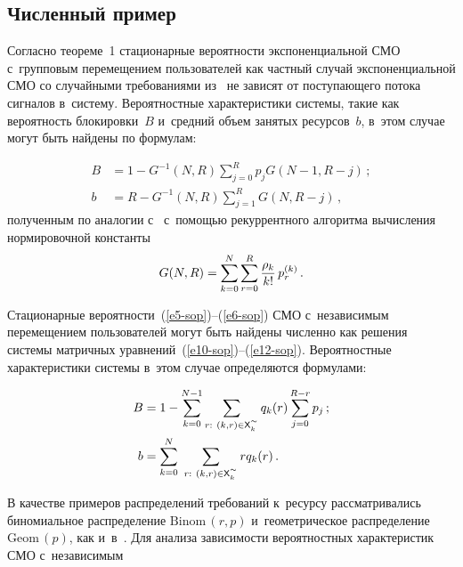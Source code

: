 \begin{multicols}{2}
\section{Численный пример}

  Согласно теореме~1 стационарные вероятности экспоненциальной СМО 
с~групповым перемещением пользователей как частный случай 
экспоненциальной СМО со случайными требованиями из~\cite{8-sop} не 
зависят от поступающего потока сигналов в~систему. Вероятностные 
характеристики системы, такие как вероятность блокировки~$B$ и~средний 
объем занятых ресурсов~$b$, в~этом случае могут быть найдены по 
формулам:

\noindent
  \begin{align*}
  B &= 1-G^{-1}(N,R)\sum\limits_{j=0}^R p_j G(N-1,R-j)\,;
  \\
  b &= R-G^{-1}(N,R) \sum\limits_{j=1}^R G(N,R-j)\,, %
  \end{align*}
полученным по аналогии с~\cite{11-sop} с~по\-мощью рекуррентного 
алгоритма вычисления нормировочной константы 
$$
G(N,R)= 
\sum\limits_{k=0}^N \sum\limits_{r=0}^R \displaystyle\frac{\displaystyle \rho_k\mathstrut}{\displaystyle k!\mathstrut}\,p_r^{(k)}\,. 
$$

  Стационарные вероятности~(\ref{e5-sop})--(\ref{e6-sop}) СМО 
с~независимым перемещением пользователей могут быть найдены численно 
как решения системы матричных уравнений~(\ref{e10-sop})--(\ref{e12-sop}). 
Вероятностные характеристики системы в~этом случае определяются 
формулами: 

\noindent
  \begin{align*}
  B&= 1-\sum\limits_{k=0}^{N-1} \sum
  \limits_{r:\ (k,r)\in{\sf X}^{\sptilde}_k} q_k(r)\sum\limits_{j=0}^{R-r} 
p_j\,; %
\\
  b&= \sum\limits^N_{k=0} \ \sum\limits_{r:\ (k,r)\in{\sf X}^{\sptilde}_k} rq_k(r)\,.
  \end{align*}
  

  
  В качестве примеров распределений требований к~ресурсу 
рассматривались биномиальное распределение $\mathrm{Binom}\,(r,p)$ 
и~геометрическое распределение $\mathrm{Geom}\,(p)$, как и~в~\cite{12-sop}. Для 
анализа зависимости  вероятностных характеристик СМО с~независимым\linebreak\vspace*{-12pt}


\end{multicols}
